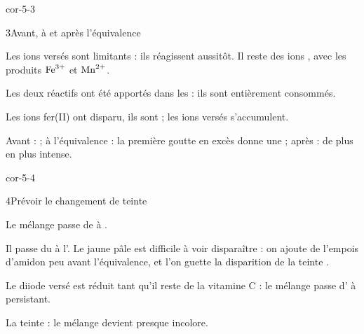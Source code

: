 \begin{blocLivre}{cor-5-3}
\begin{corrige}{3}{Avant, à et après l'équivalence}
\begin{questions}
\item Les ions  versés sont limitants : ils réagissent aussitôt. Il reste des ions , avec
les produits $\ce{Fe^{3+}}$ et $\ce{Mn^{2+}}$.
\item Les deux réactifs ont été apportés dans les  : ils sont entièrement consommés.
\item Les ions fer(II) ont disparu, ils sont  ; les ions  versés s'accumulent.
\item Avant :  ; à l'équivalence : la première goutte en excès donne une  ;
après :  de plus en plus intense.
\end{questions}
\end{corrige}
\end{blocLivre}
\begin{blocLivre}{cor-5-4}
\begin{corrige}{4}{Prévoir le changement de teinte}
\begin{questions}
\item Le mélange passe de  à .
\item Il passe du  à l'. Le jaune pâle est difficile à voir disparaître : on ajoute de l'empois
d'amidon peu avant l'équivalence, et l'on guette la disparition de la teinte .
\item Le diiode versé est réduit tant qu'il reste de la vitamine C : le mélange passe d' à  persistant.
\item La teinte  : le mélange devient presque incolore.
\end{questions}
\end{corrige}
\end{blocLivre}
